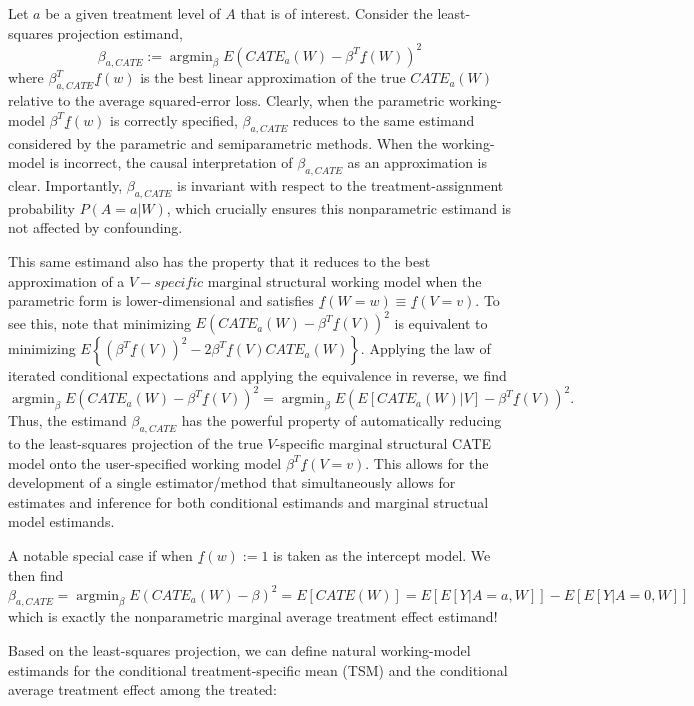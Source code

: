 \documentclass[
]{jss}
\DeclareMathOperator{\argmin}{argmin}
\begin{document}
Let \(a\) be a given treatment level of \(A\) that is of interest.
Consider the least-squares projection estimand, \begin{equation}
\beta_{a,CATE} := \argmin_{\beta} E\left(CATE_a(W) - \beta^T \underline{f}(W) \right)^2 \label{eqn::estimandNPCATE}
\end{equation} where \(\beta_{a,CATE}^T \underline{f}(w)\) is the best
linear approximation of the true \(CATE_a(W)\) relative to the average
squared-error loss. Clearly, when the parametric working-model
\(\beta^T \underline{f}(w)\) is correctly specified, \(\beta_{a,CATE}\)
reduces to the same estimand considered by the parametric and
semiparametric methods. When the working-model is incorrect, the causal
interpretation of \(\beta_{a,CATE}\) as an approximation is clear.
Importantly, \(\beta_{a,CATE}\) is invariant with respect to the
treatment-assignment probability \(P(A=a|W)\), which crucially ensures
this nonparametric estimand is not affected by confounding.

This same estimand also has the property that it reduces to the best
approximation of a \(V-specific\) marginal structural working model when
the parametric form is lower-dimensional and satisfies
\(\underline{f}(W=w) \equiv \underline{f}(V=v)\). To see this, note that
minimizing \(E\left(CATE_a(W) - \beta^T \underline{f}(V) \right)^2\) is
equivalent to minimizing
\(E\left\{\left( \beta^T \underline{f}(V) \right)^2 - 2 \beta^T \underline{f}(V)CATE_a(W) \right\}\).
Applying the law of iterated conditional expectations and applying the
equivalence in reverse, we find
\[\argmin_{\beta} E\left(CATE_a(W) - \beta^T \underline{f}(V) \right)^2 = \argmin_{\beta} E\left(E[CATE_a(W)|V] - \beta^T \underline{f}(V) \right)^2.\]
Thus, the estimand \(\beta_{a,CATE}\) has the powerful property of
automatically reducing to the least-squares projection of the true
\(V\)-specific marginal structural CATE model onto the user-specified
working model \(\beta^T \underline{f}(V=v)\). This allows for the
development of a single estimator/method that simultaneously allows for
estimates and inference for both conditional estimands and marginal
structual model estimands.

A notable special case if when \(\underline{f}(w) := 1\) is taken as the
intercept model. We then find
\[\beta_{a,CATE} = \argmin_{\beta} E\left(CATE_a(W) - \beta \right)^2 = E[CATE(W)] = E[E[Y|A=a,W]] - E[E[Y|A=0,W]]\]
which is exactly the nonparametric marginal average treatment effect
estimand!

Based on the least-squares projection, we can define natural
working-model estimands for the conditional treatment-specific mean
(TSM) and the conditional average treatment effect among the treated:
\end{document}
